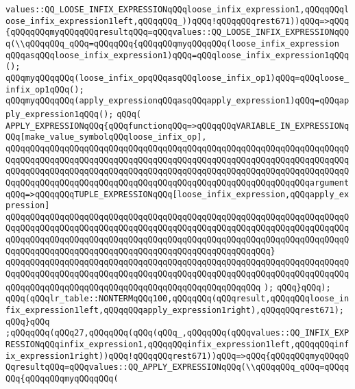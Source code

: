 \verb|values::QQ_LOOSE_INFIX_EXPRESSIONqQQqloose_infix_expression1,qQQqqQQqloose_infix_expression1left,qQQqqQQq_))qQQq!qQQqqQQqrest671))qQQq=>qQQq{qQQqqQQqmyqQQqqQQqresultqQQq=qQQqvalues::QQ_LOOSE_INFIX_EXPRESSIONqQQq(\\qQQqqQQq_qQQq=qQQqqQQq{qQQqqQQqmyqQQqqQQq(loose_infix_expression|\newline
\verb|qQQqasqQQqloose_infix_expression1)qQQq=qQQqloose_infix_expression1qQQq();|\newline
\verb|qQQqmyqQQqqQQq(loose_infix_opqQQqasqQQqloose_infix_op1)qQQq=qQQqloose_infix_op1qQQq();|\newline
\verb|qQQqmyqQQqqQQq(apply_expressionqQQqasqQQqapply_expression1)qQQq=qQQqapply_expression1qQQq();|\newline
\verb|qQQq(|\newline
\verb|APPLY_EXPRESSIONqQQq{qQQqfunctionqQQq=>qQQqqQQqVARIABLE_IN_EXPRESSIONqQQq[make_value_symbolqQQqloose_infix_op],|\newline
\verb|qQQqqQQqqQQqqQQqqQQqqQQqqQQqqQQqqQQqqQQqqQQqqQQqqQQqqQQqqQQqqQQqqQQqqQQqqQQqqQQqqQQqqQQqqQQqqQQqqQQqqQQqqQQqqQQqqQQqqQQqqQQqqQQqqQQqqQQqqQQqqQQqqQQqqQQqqQQqqQQqqQQqqQQqqQQqqQQqqQQqqQQqqQQqqQQqqQQqqQQqqQQqqQQqqQQqqQQqqQQqqQQqqQQqqQQqqQQqqQQqqQQqqQQqqQQqqQQqqQQqqQQqqQQqqQQqargumentqQQq=>qQQqqQQqTUPLE_EXPRESSIONqQQq[loose_infix_expression,qQQqapply_expression]|\newline
\verb|qQQqqQQqqQQqqQQqqQQqqQQqqQQqqQQqqQQqqQQqqQQqqQQqqQQqqQQqqQQqqQQqqQQqqQQqqQQqqQQqqQQqqQQqqQQqqQQqqQQqqQQqqQQqqQQqqQQqqQQqqQQqqQQqqQQqqQQqqQQqqQQqqQQqqQQqqQQqqQQqqQQqqQQqqQQqqQQqqQQqqQQqqQQqqQQqqQQqqQQqqQQqqQQqqQQqqQQqqQQqqQQqqQQqqQQqqQQqqQQqqQQqqQQqqQQqqQQqqQQqqQQq}|\newline
\verb|qQQqqQQqqQQqqQQqqQQqqQQqqQQqqQQqqQQqqQQqqQQqqQQqqQQqqQQqqQQqqQQqqQQqqQQqqQQqqQQqqQQqqQQqqQQqqQQqqQQqqQQqqQQqqQQqqQQqqQQqqQQqqQQqqQQqqQQqqQQqqQQqqQQqqQQqqQQqqQQqqQQqqQQqqQQqqQQqqQQqqQQqqQQqqQQq|\newline
\verb|);|\newline
\verb|qQQq}qQQq);|\newline
\verb|qQQq(qQQqlr_table::NONTERMqQQq100,qQQqqQQq(qQQqresult,qQQqqQQqloose_infix_expression1left,qQQqqQQqapply_expression1right),qQQqqQQqrest671);|\newline
\verb|qQQq}qQQq|\newline
\verb|;qQQqqQQq(qQQq27,qQQqqQQq(qQQq(qQQq_,qQQqqQQq(qQQqvalues::QQ_INFIX_EXPRESSIONqQQqinfix_expression1,qQQqqQQqinfix_expression1left,qQQqqQQqinfix_expression1right))qQQq!qQQqqQQqrest671))qQQq=>qQQq{qQQqqQQqmyqQQqqQQqresultqQQq=qQQqvalues::QQ_APPLY_EXPRESSIONqQQq(\\qQQqqQQq_qQQq=qQQqqQQq{qQQqqQQqmyqQQqqQQq(|\newline
